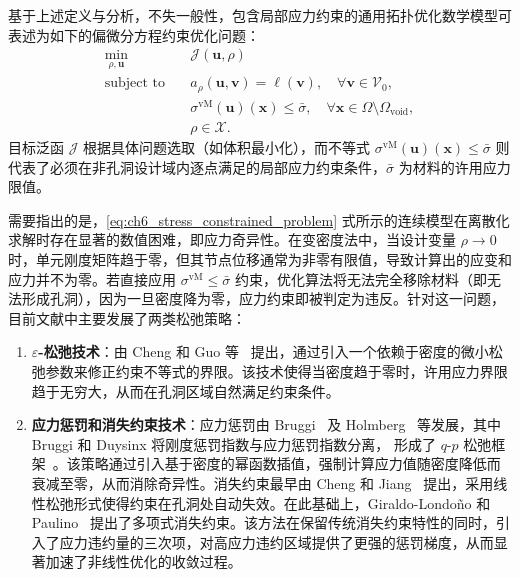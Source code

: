 基于上述定义与分析，不失一般性，包含局部应力约束的通用拓扑优化数学模型可表述为如下的偏微分方程约束优化问题：
\begin{equation} 
	\begin{aligned}
		\min_{\rho,\boldsymbol{u}}\quad&\mathcal{J}(\boldsymbol{u}, \rho)\\
		\text{subject~to}\quad&
		a_\rho(\boldsymbol{u},\boldsymbol{v}) = \ell(\boldsymbol{v}),\quad\forall\boldsymbol{v}\in\mathcal{V}_0,\\
		&\sigma^{\text{vM}}(\boldsymbol{u})(\boldsymbol{x}) \le \bar{\sigma}, \quad \forall \boldsymbol{x} \in \Omega \setminus \Omega_{\text{void}},\\
		&\rho\in\mathcal{X}.
	\end{aligned}
	\label{eq:ch6_stress_constrained_problem}
\end{equation}
目标泛函 $\mathcal{J}$ 根据具体问题选取（如体积最小化），而不等式 $\sigma^{\text{vM}}(\boldsymbol{u})(\boldsymbol{x}) \le \bar{\sigma}$ 则代表了必须在非孔洞设计域内逐点满足的局部应力约束条件，$\bar{\sigma}$ 为材料的许用应力限值。

需要指出的是，\eqref{eq:ch6_stress_constrained_problem} 式所示的连续模型在离散化求解时存在显著的数值困难，即应力奇异性。在变密度法中，当设计变量 $\rho \to 0$ 时，单元刚度矩阵趋于零，但其节点位移通常为非零有限值，导致计算出的应变和应力并不为零。若直接应用 $\sigma^{\text{vM}} \le \bar{\sigma}$ 约束，优化算法将无法完全移除材料（即无法形成孔洞），因为一旦密度降为零，应力约束即被判定为违反。针对这一问题，目前文献中主要发展了两类松弛策略：

\begin{enumerate}[{（}1{）}]
	\item \textbf{$\varepsilon$-松弛技术}：由 Cheng 和 Guo 等~\cite{chengErelaxedApproachStructural1997} 提出，通过引入一个依赖于密度的微小松弛参数来修正约束不等式的界限。该技术使得当密度趋于零时，许用应力界限趋于无穷大，从而在孔洞区域自然满足约束条件。
	
	\item \textbf{应力惩罚和消失约束技术}：应力惩罚由 Bruggi~\cite{bruggiAlternativeApproachStress2008a} 及 Holmberg~\cite{holmbergStressConstrainedTopology2013a} 等发展，其中 Bruggi 和 Duysinx 将刚度惩罚指数与应力惩罚指数分离，
	形成了 $q\text{-}p$ 松弛框架~\cite{bruggiTopologyOptimizationMinimum2012}。该策略通过引入基于密度的幂函数插值，强制计算应力值随密度降低而衰减至零，从而消除奇异性。消失约束最早由 Cheng 和 Jiang~\cite{chengStudyTopologyOptimization1992} 提出，采用线性松弛形式使得约束在孔洞处自动失效。在此基础上，Giraldo-Londoño 和 Paulino~\cite{giraldo-londonoUnifiedApproachTopology2020} 提出了多项式消失约束。该方法在保留传统消失约束特性的同时，引入了应力违约量的三次项，对高应力违约区域提供了更强的惩罚梯度，从而显著加速了非线性优化的收敛过程。
\end{enumerate}

